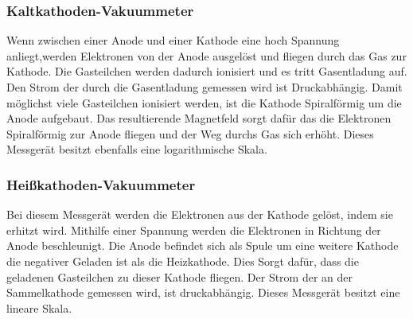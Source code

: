 \subsubsection{Kaltkathoden-Vakuummeter}
Wenn zwischen einer Anode und einer Kathode eine hoch Spannung anliegt,werden Elektronen von der Anode ausgelöst und fliegen durch das Gas zur Kathode. Die Gasteilchen werden dadurch ionisiert und es tritt Gasentladung auf. Den Strom der durch die Gasentladung gemessen wird ist Druckabhängig. Damit möglichst viele Gasteilchen ionisiert werden, ist die Kathode Spiralförmig um die Anode aufgebaut. Das resultierende Magnetfeld sorgt dafür das die Elektronen Spiralförmig zur Anode fliegen und der Weg durchs Gas sich erhöht. Dieses Messgerät besitzt ebenfalls eine logarithmische Skala.
\subsubsection{Heißkathoden-Vakuummeter}
Bei diesem Messgerät werden die Elektronen aus der Kathode gelöst, indem sie erhitzt wird. Mithilfe einer Spannung werden die Elektronen in Richtung der Anode beschleunigt. Die Anode befindet sich als Spule um eine weitere Kathode die negativer Geladen ist als die Heizkathode. Dies Sorgt dafür, dass die geladenen Gasteilchen zu dieser Kathode fliegen. Der Strom der an der Sammelkathode gemessen wird, ist druckabhängig. Dieses Messgerät besitzt eine lineare Skala.